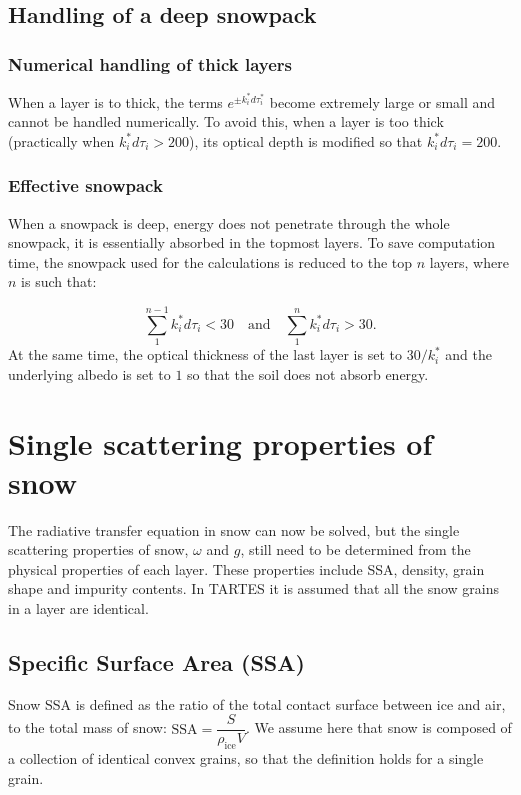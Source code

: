 \documentclass[a4paper,11pt]{article}
\begin{document}
\subsection{Handling of a deep snowpack}
\subsubsection{Numerical handling of thick layers}
When a layer is to thick, the terms $e^{\pm k_i^*d\tau_i^*}$ become extremely large or small and cannot be handled numerically. To avoid this, when a layer is too thick (practically when $k_i^*d\tau_i>200$), its optical depth is modified so that $k_i^*d\tau_i=200$.

\subsubsection{Effective snowpack}
When a snowpack is deep, energy does not penetrate through the whole snowpack, it is essentially absorbed in the topmost layers. To save computation time, the snowpack used for the calculations is reduced to the top $n$ layers, where $n$ is such that:

\begin{equation}
\displaystyle\sum\limits_{1}^{n-1}k_i^*d\tau_i<30 \quad \textrm{and} \quad \displaystyle\sum\limits_{1}^{n}k_i^*d\tau_i>30.
\end{equation}
At the same time, the optical thickness of the last layer is set to $30/k_i^*$ and the underlying albedo is set to $1$ so that the soil does not absorb energy.

\section{Single scattering properties of snow}

The radiative transfer equation in snow can now be solved, but the single scattering properties of snow, $\omega$ and $g$, still need to be determined from the physical properties of each layer. These properties include SSA, density, grain shape and impurity contents. In TARTES it is assumed that all the snow grains in a layer are identical. 

\subsection{Specific Surface Area (SSA)}
Snow SSA is defined as the ratio of the total contact surface between ice and air, to the total mass of snow: $\textrm{SSA}=\dfrac{S}{\rho_\textrm{ice}V}$. We assume here that snow is composed of a collection of identical convex grains, so that the definition holds for a single grain.
\end{document}
